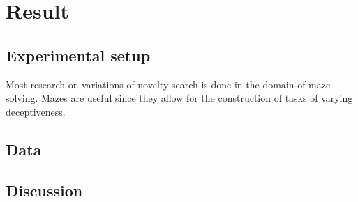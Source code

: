 \section{Result}
\label{sec:Result}
\subsection{Experimental setup}
Most research on variations of novelty search is done in the domain of maze solving. Mazes are useful
since they allow for the construction of tasks of varying deceptiveness.

\subsection{Data}
\subsection{Discussion}
